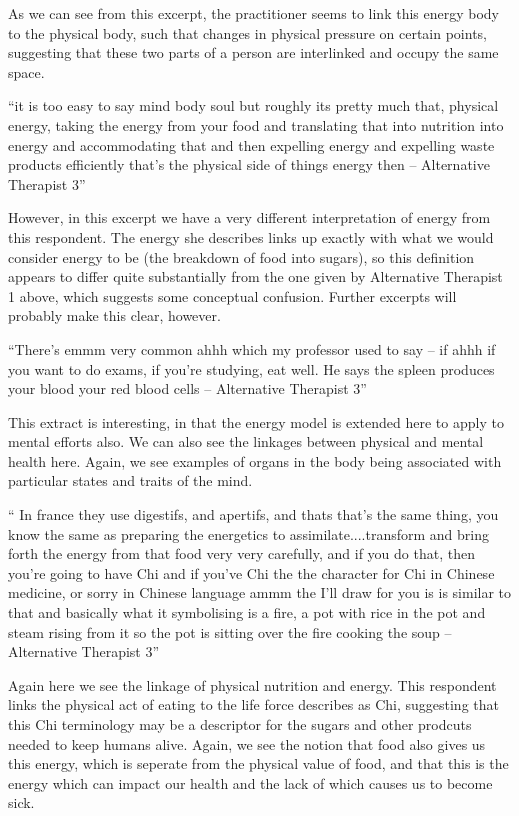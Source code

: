 As we can see from this excerpt, the practitioner seems to link this energy body to the physical body, such that changes in physical pressure on certain points, suggesting that these two parts of a person are interlinked and occupy the same space. 

``it is too easy to say mind body soul but roughly its pretty much that, physical energy, taking the energy from your food and translating that into nutrition into energy and accommodating that and then expelling energy and expelling waste products efficiently that's the physical side of things energy then – Alternative Therapist 3''

However, in this excerpt we have a very different interpretation of energy from this respondent. The energy she describes links up exactly with what we would consider energy to be (the breakdown of food into sugars), so this definition appears to differ quite substantially from the one given by Alternative Therapist 1 above, which suggests some conceptual confusion. Further excerpts will probably make this clear, however. 

``There's emmm very common ahhh which my professor used to say – if ahhh if you want to do exams, if you're studying, eat well. He says the spleen produces your blood your red blood cells – Alternative Therapist 3''

This extract is interesting, in that the energy model is extended here to apply to mental efforts also. We can also see the linkages between physical and mental health here. Again, we see examples of organs in the body being associated with particular states and traits of the mind. 

`` In france they use digestifs, and apertifs, and thats that's the same thing, you know the same as preparing the energetics to assimilate....transform and bring forth the energy from that food very very carefully, and if you do that, then you're going to have Chi and if you've Chi the the character for Chi in Chinese medicine, or sorry in Chinese language ammm the I'll draw for you is is similar to that and basically what it symbolising is a fire, a pot with rice in the pot and steam rising from it so the pot is sitting over the fire cooking the soup – Alternative Therapist 3''

Again here we see the linkage of physical nutrition and energy. This respondent links the physical act of eating to the life force describes as Chi, suggesting that this Chi terminology may be a descriptor for the sugars and other prodcuts needed to keep humans alive. Again, we see the notion that food also gives us this energy, which is seperate from the physical value of food, and that this is the energy which can impact our health and the lack of which causes us to become sick. 



